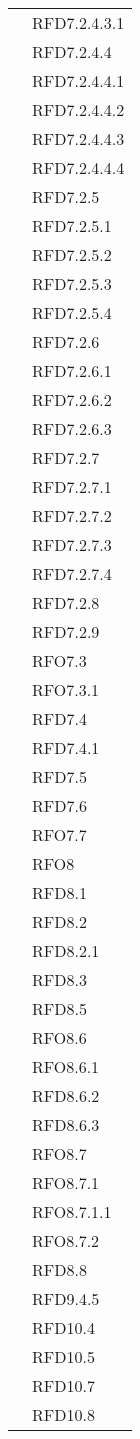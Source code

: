 \begin{longtable}{|>{\centering}m{10cm}|m{3cm}<{\centering}|}
& RFD7.2.4.3.1\\
& RFD7.2.4.4\\
& RFD7.2.4.4.1\\
& RFD7.2.4.4.2\\
& RFD7.2.4.4.3\\
& RFD7.2.4.4.4\\
& RFD7.2.5\\
& RFD7.2.5.1\\
& RFD7.2.5.2\\
& RFD7.2.5.3\\
& RFD7.2.5.4\\
& RFD7.2.6\\
& RFD7.2.6.1\\
& RFD7.2.6.2\\
& RFD7.2.6.3\\
& RFD7.2.7\\
& RFD7.2.7.1\\
& RFD7.2.7.2\\
& RFD7.2.7.3\\
& RFD7.2.7.4\\
& RFD7.2.8\\
& RFD7.2.9\\
& RFO7.3\\
& RFO7.3.1\\
& RFD7.4\\
& RFD7.4.1\\
& RFD7.5\\
& RFD7.6\\
& RFO7.7\\
& RFO8\\
& RFD8.1\\
& RFD8.2\\
& RFD8.2.1\\
& RFD8.3\\
& RFD8.5\\
& RFO8.6\\
& RFO8.6.1\\
& RFD8.6.2\\
& RFD8.6.3\\
& RFO8.7\\
& RFO8.7.1\\
& RFO8.7.1.1\\
& RFO8.7.2\\
& RFD8.8\\
& RFD9.4.5\\
& RFD10.4\\
& RFD10.5\\
& RFD10.7\\
& RFD10.8\\

\end{longtable}
